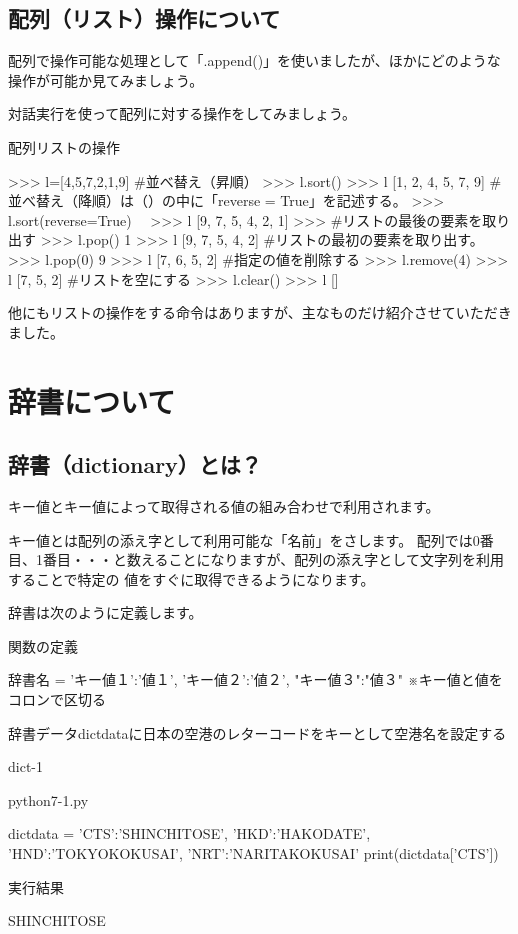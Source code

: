 \documentclass[11pt,a4paper,dvipdfmx,titlepage]{jsreport}
\begin{document}
\subsection{配列（リスト）操作について}
配列で操作可能な処理として「.append()」を使いましたが、ほかにどのような操作が可能か見てみましょう。

 {\gt 対話実行}を使って配列に対する操作をしてみましょう。

\begin{grabox}{配列リストの操作}
\begin{listing}{1}
>>> l=[4,5,7,2,1,9]
#並べ替え（昇順）
>>> l.sort()
>>> l
[1, 2, 4, 5, 7, 9]
#並べ替え（降順）は（）の中に「reverse = True」を記述する。
>>> l.sort(reverse=True)　
>>> l
[9, 7, 5, 4, 2, 1]
>>>
#リストの最後の要素を取り出す
>>> l.pop()
1
>>> l
[9, 7, 5, 4, 2]
#リストの最初の要素を取り出す。
>>> l.pop(0)
9
>>> l
[7, 6, 5, 2]
#指定の値を削除する
>>> l.remove(4)
>>> l
[7, 5, 2]
#リストを空にする
>>> l.clear()
>>> l
[]
\end{listing}
\end{grabox}
他にもリストの操作をする命令はありますが、主なものだけ紹介させていただきました。

\section{辞書について}
\subsection{辞書（dictionary）とは？}

キー値とキー値によって取得される値の組み合わせで利用されます。

キー値とは配列の添え字として利用可能な「名前」をさします。
配列では0番目、1番目・・・と数えることになりますが、配列の添え字として文字列を利用することで特定の
値をすぐに取得できるようになります。

辞書は次のように定義します。
\begin{grabox}{関数の定義}
\begin{listing}{1}
辞書名 = {'キー値１':'値１', 'キー値２':'値２', "キー値３":"値３"}
※キー値と値をコロンで区切る
\end{listing}
\end{grabox}
辞書データdictdataに日本の空港のレターコードをキーとして空港名を設定する
\begin{pabox}{dict-1}
\begin{codebox}{python7-1.py}
\begin{listing}{1}
dictdata = {'CTS':'SHINCHITOSE', 'HKD':'HAKODATE', 'HND':'TOKYOKOKUSAI', 
    'NRT':'NARITAKOKUSAI' }
print(dictdata['CTS'])
   
\end{listing}

実行結果
\begin{listing}{1}
SHINCHITOSE
\end{listing}
\end{codebox}
\end{pabox}
\end{document}
